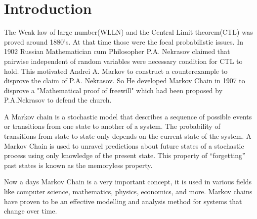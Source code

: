 \chapter{Introduction}
The Weak law of large number(WLLN) and the Central Limit theorem(CTL) was proved around  1880's. At that time those were the focal probabilistic issues.
In 1902 Russian Mathematician cum Philosopher P.A. Nekrasov claimed that pairwise independent of random variables were necessary condition for CTL to hold. 
This motivated Andrei A. Markov to construct a counterexample to disprove the claim of P.A. Nekrasov. So He developed Markov Chain in 1907 to disprove a 
"Mathematical proof of freewill" which had been proposed by P.A.Nekrasov to defend the church.

 A Markov chain is a stochastic model that describes a sequence of possible
events or transitions from one state to another of a system. The probability of transitions
from state to state only depends on the current state of the system. A Markov Chain is
used to unravel predictions about future states of a stochastic process using only knowledge
of the present state. This property of “forgetting” past states is known as the memoryless
property.

Now a days Markov Chain is a very important concept, it is used in various fields like computer science, mathematics, physics, economics, and more.
Markov chains have proven to be an effective modelling and analysis method for systems that change over time.

